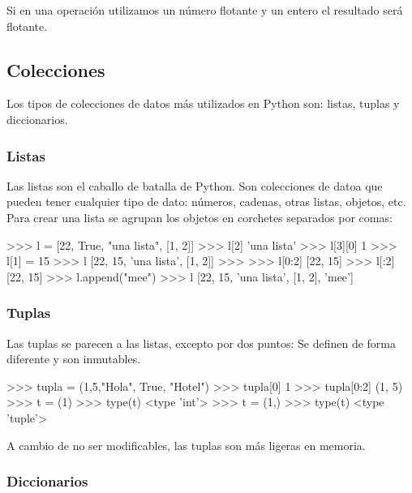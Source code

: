 Si en una operación utilizamos un número flotante y un entero el resultado será flotante.\\

\subsection{Colecciones}

Los tipos de colecciones de datos más utilizados en Python son: listas, tuplas y diccionarios.\\

\subsubsection{Listas}

Las listas son el caballo de batalla de Python. Son colecciones de datoa que pueden tener cualquier tipo de dato: números, cadenas, otras listas, objetos, etc.\\

Para crear una lista se agrupan los objetos en corchetes separados por comas:\\

\begin{pyglist}[language=python]
>>> l = [22, True, "una lista", [1, 2]]
>>> l[2]
'una lista'
>>> l[3][0]
1
>>> l[1] = 15
>>> l
[22, 15, 'una lista', [1, 2]]
>>> 
>>> l[0:2]
[22, 15]
>>> l[:2]
[22, 15]
>>> l.append("mee")
>>> l
[22, 15, 'una lista', [1, 2], 'mee']
\end{pyglist}

\subsubsection{Tuplas}

Las tuplas se parecen a las listas, excepto por dos puntos: Se definen de forma diferente y son inmutables.\\

\begin{pyglist}[language=python]
>>> tupla = (1,5,"Hola", True, "Hotel")
>>> tupla[0]
1
>>> tupla[0:2]
(1, 5)
>>> t = (1)
>>> type(t)
<type 'int'>
>>> t = (1,)
>>> type(t)
<type 'tuple'>
\end{pyglist}

A cambio de no ser modificables, las tuplas son más ligeras en memoria.

\subsubsection{Diccionarios}

